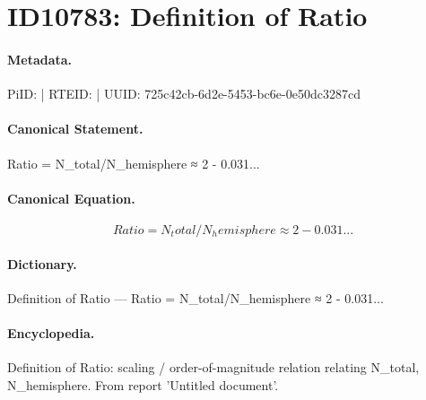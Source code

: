 \section*{ID10783: Definition of Ratio}
\paragraph{Metadata.}
PiID:  | RTEID:  | UUID: 725c42cb-6d2e-5453-bc6e-0e50dc3287cd

\paragraph{Canonical Statement.}
Ratio = N\_total/N\_hemisphere ≈ 2 - 0.031...

\paragraph{Canonical Equation.}
\[
Ratio = N_total/N_hemisphere ≈ 2 - 0.031...
\]

\paragraph{Dictionary.}
Definition of Ratio — Ratio = N\_total/N\_hemisphere ≈ 2 - 0.031...

\paragraph{Encyclopedia.}
Definition of Ratio: scaling / order-of-magnitude relation relating N\_total, N\_hemisphere. From report 'Untitled document'.
